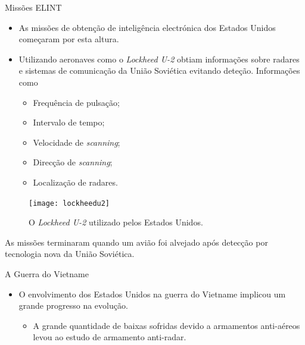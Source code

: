 \documentclass[portuguese,10pt]{beamer}
\begin{document}
\begin{frame}{Missões ELINT}
    \begin{minipage}[c]{0.57\textwidth}
        \begin{itemize}
            \item As missões de obtenção de inteligência electrónica dos Estados Unidos começaram por esta altura.
            \item Utilizando aeronaves como o \textit{Lockheed U-2} obtiam informações sobre radares e sistemas de comunicação da União Soviética evitando deteção. Informações como
            \begin{itemize}
                \item Frequência de pulsação;
                \item Intervalo de tempo;
                \item Velocidade de \textit{scanning};
                \item Direcção de \textit{scanning};
                \item Localização de radares.
            \end{itemize}
        \end{itemize}
    \end{minipage}
    \hfill
    \begin{minipage}[c]{0.4\textwidth}
        \begin{figure}
            \centering
            \texttt{[image: lockheedu2]}
            \caption{O \textit{Lockheed U-2} utilizado pelos Estados Unidos.}
        \end{figure}
    \end{minipage}
    \vspace*{5mm}
    
    As missões terminaram quando um avião foi alvejado após detecção por tecnologia nova da União Soviética.
\end{frame}

\begin{frame}{A Guerra do Vietname}
    \begin{itemize}
        \item O envolvimento dos Estados Unidos na guerra do Vietname implicou um grande progresso na evolução.
        \begin{itemize}
            \item A grande quantidade de baixas sofridas devido a armamentos anti-aéreos levou ao estudo de armamento anti-radar.
        \end{itemize}
    \end{itemize}
\end{frame}
\end{document}
